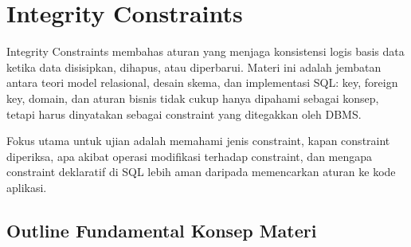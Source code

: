 \section{Integrity Constraints}

Integrity Constraints membahas aturan yang menjaga konsistensi logis basis data ketika data disisipkan, dihapus, atau diperbarui. Materi ini adalah jembatan antara teori model relasional, desain skema, dan implementasi SQL: key, foreign key, domain, dan aturan bisnis tidak cukup hanya dipahami sebagai konsep, tetapi harus dinyatakan sebagai constraint yang ditegakkan oleh DBMS.

Fokus utama untuk ujian adalah memahami jenis constraint, kapan constraint diperiksa, apa akibat operasi modifikasi terhadap constraint, dan mengapa constraint deklaratif di SQL lebih aman daripada memencarkan aturan ke kode aplikasi.

\subsection{Outline Fundamental Konsep Materi}

